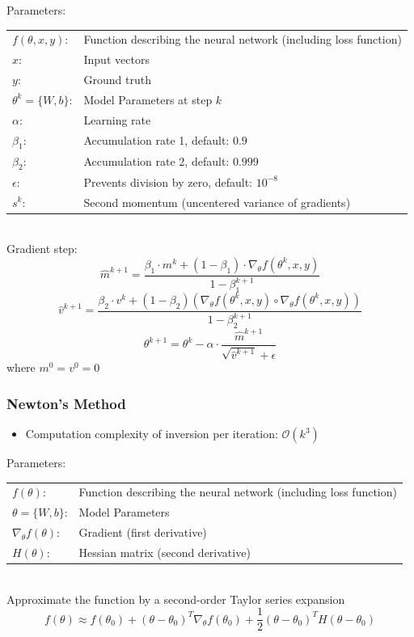 \documentclass[10pt,a4paper]{article}
\newcommand{\props}{$\circ$}
\newcommand{\iprops}{\item[\props]}
\begin{document}
Parameters: \\
\begin{tabular}{ll}
	$f(\theta, x, y)$: & Function describing the neural network (including loss function) \\
	$x$: & Input vectors \\
	$y$: & Ground truth \\
	$\theta^k = \{W, b\}$: & Model Parameters at step $k$\\
	$\alpha$: & Learning rate \\
	$\beta_1$: & Accumulation rate 1, default: $0.9$ \\
	$\beta_2$: & Accumulation rate 2, default: $0.999$ \\
	$\epsilon$: & Prevents division by zero, default: $10^{-8}$ \\
	$s^k$: & Second momentum (uncentered variance of gradients)
\end{tabular} \\

Gradient step:
$$
	\hat m^{k + 1} = \frac{\beta_1 ⋅ m^k + (1 -\beta_1) ⋅ \nabla_\theta f(\theta^k, x, y)}{1 - \beta_1^{k + 1}}
$$
$$
	\hat v^{k + 1} = \frac{\beta_2 ⋅ v^k + (1 - \beta_2)(\nabla_\theta f(\theta^k, x, y) \circ \nabla_\theta f(\theta^k, x, y))}{1 - \beta_2^{k + 1}}
$$
$$
	\theta^{k + 1} = \theta^k - \alpha ⋅ \frac{\hat m^{k + 1}}{\sqrt{\hat v^{k + 1}} + \epsilon}
$$
where $m^0 = v^0 = 0$

\subsubsection{Newton's Method}
\begin{itemize}
	\iprops Computation complexity of inversion per iteration: $\mathcal O(k^3)$
\end{itemize}

Parameters: \\
\begin{tabular}{ll}
	$f(\theta)$: & Function describing the neural network (including loss function) \\
	$\theta = \{W, b\}$: & Model Parameters \\
	$\nabla_\theta f(\theta)$: & Gradient (first derivative) \\
	$H(\theta)$: & Hessian matrix (second derivative)
\end{tabular} \\

Approximate the function by a second-order Taylor series expansion
$$
	f(\theta) \approx f(\theta_0) + (\theta - \theta_0)^T \nabla_\theta f(\theta_0) + \frac 1 2 (\theta - \theta_0)^T H(\theta - \theta_0)
$$
\end{document}
